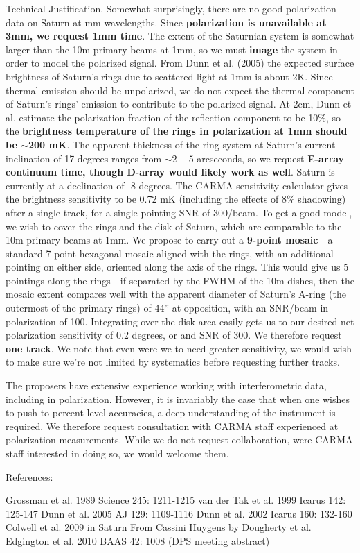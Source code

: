 \documentclass[a4paper,12pt]{article}
\begin{document}
Technical Justification.
Somewhat surprisingly, there are no good polarization data on Saturn
at mm wavelengths.  Since {\bf{polarization is unavailable at 3mm, we
    request 1mm time}}.  The extent of the Saturnian system is
somewhat larger than the 10m primary beams at 1mm, so we must
{\bf{image}} the system in order to model the polarized signal.  From
Dunn et al. (2005) the expected surface brightness of Saturn's rings
due to scattered light at 1mm is about 2K.  Since thermal emission
should be unpolarized, we do not expect the thermal component of
Saturn's rings' emission to contribute to the polarized signal.  At
2cm, Dunn et al. estimate the polarization fraction of the reflection
component to be 10\%, so the {\bf{brightness temperature of the rings
    in polarization at 1mm should be $\sim$200 mK}}.  The apparent
thickness of the ring system at Saturn's current inclination of 17
degrees ranges from $\sim 2-5$ arcseconds, so we request {\bf{E-array continuum
    time, though D-array would likely work as well}}.  Saturn is
currently at a declination of -8 degrees.  The CARMA sensitivity
calculator gives the brightness sensitivity to be 0.72 mK (including
the effects of 8\% shadowing) after a single track, for a
single-pointing SNR of 300/beam.  To get a good model, we wish to
cover the rings and the disk of Saturn, which are comparable to the
10m primary beams at 1mm.  We propose to carry out a {\bf{9-point
    mosaic}} - a standard 7 point hexagonal mosaic aligned with the
rings, with an additional pointing on either side, oriented along the
axis of the rings.  This would give us 5 pointings along the rings -
if separated by the FWHM of the 10m dishes, then the mosaic extent
compares well with the apparent diameter of Saturn's A-ring (the
outermost of the primary rings) of 44'' at opposition, with an SNR/beam in
polarization of 100.  Integrating over the disk area easily gets us to
our desired net polarization sensitivity of 0.2 degrees, or and SNR of
300.  We therefore request {\bf{one track}}.  We note that even were
we to need greater sensitivity, we would wish to make sure we're not
limited by systematics before requesting further tracks.

The proposers have extensive experience working with interferometric
data, including in polarization.  However, it is invariably the case
that when  one wishes to push to percent-level accuracies, a deep
understanding of the instrument is required.  We therefore request
consultation with CARMA staff experienced at polarization
measurements.  While we do not request collaboration, were CARMA staff
interested in doing so, we would welcome them.  


References:

Grossman et al. 1989 Science 245: 1211-1215
van der Tak et al. 1999 Icarus 142: 125-147
Dunn et al. 2005 AJ 129: 1109-1116
Dunn et al. 2002 Icarus 160: 132-160
Colwell et al. 2009 in Saturn From Cassini Huygens by Dougherty et al.
Edgington et al. 2010 BAAS 42: 1008 (DPS meeting abstract)
\end{document}
